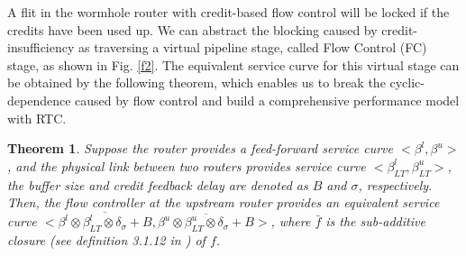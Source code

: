 \documentclass[preprint]{elsarticle}
\newtheorem{thm}{Theorem}
\begin{document}
A flit in the wormhole router with credit-based flow control will be locked if the credits have been used up. We can abstract the blocking caused by credit-insufficiency as traversing a virtual pipeline stage, called Flow Control (FC) stage, as shown in Fig. \ref{f2}. The equivalent service curve for this virtual stage can be obtained by the following theorem, which enables us to break the cyclic-dependence caused by flow control and build a comprehensive performance model with RTC.
\begin{thm}\label{credit}
Suppose the router provides a feed-forward service curve $<\beta^l,\beta^u>$, and the physical link between two routers provides service curve $<\beta_{LT}^l,\beta_{LT}^u>$, the buffer size and credit feedback delay are denoted as $B$ and $\sigma$, respectively. Then, the flow controller at the upstream router provides an equivalent service curve $<\overline{\beta^l\otimes\beta_{LT}^l\otimes\delta_{\sigma}+B},\overline{\beta^u\otimes\beta_{LT}^u\otimes\delta_{\sigma}+B}>$, where $\bar{f}$ is the sub-additive closure (see definition 3.1.12 in \cite{Boudec2001Network}) of $f$.
\end{thm}
\end{document}
